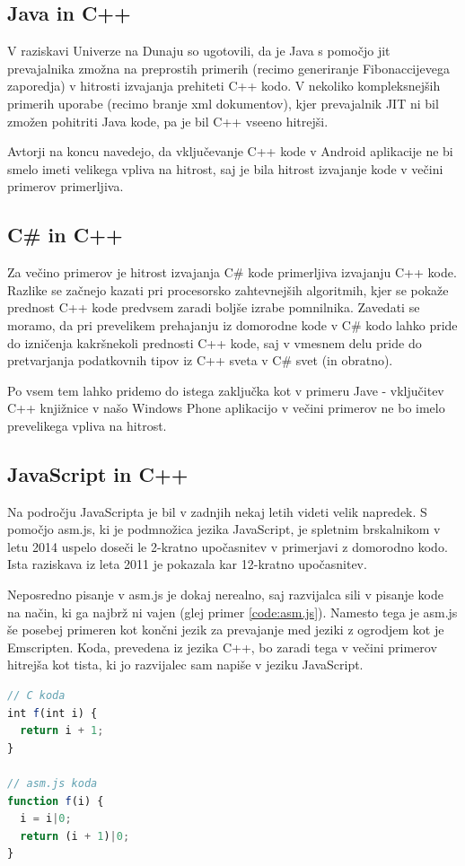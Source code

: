 \subsection{Java in C++}

V raziskavi Univerze na Dunaju\cite{android-cpp} so ugotovili, da je Java s pomočjo \gls{jit} prevajalnika zmožna na preprostih primerih (recimo generiranje Fibonaccijevega zaporedja) v hitrosti izvajanja prehiteti C++ kodo. V nekoliko kompleksnejših primerih uporabe (recimo branje \gls{xml} dokumentov), kjer prevajalnik JIT ni bil zmožen pohitriti Java kode, pa je bil C++ vseeno hitrejši.

Avtorji na koncu navedejo, da vključevanje C++ kode v Android aplikacije ne bi smelo imeti velikega vpliva na hitrost, saj je bila hitrost izvajanje kode v večini primerov primerljiva.

\subsection{C\# in C++}

Za večino primerov je hitrost izvajanja C\# kode primerljiva izvajanju C++ kode. Razlike se začnejo kazati pri procesorsko zahtevnejših algoritmih, kjer se pokaže prednost C++ kode predvsem zaradi boljše izrabe pomnilnika\cite{windows-phone-dev}. Zavedati se moramo, da pri prevelikem prehajanju iz domorodne kode v C\# kodo lahko pride do izničenja kakršnekoli prednosti C++ kode, saj v vmesnem delu pride do pretvarjanja podatkovnih tipov iz C++ sveta v C\# svet (in obratno).

Po vsem tem lahko pridemo do istega zaključka kot v primeru Jave - vključitev C++ knjižnice v našo Windows Phone aplikacijo v večini primerov ne bo imelo prevelikega vpliva na hitrost.

\subsection{JavaScript in C++}

Na področju JavaScripta je bil v zadnjih nekaj letih videti velik napredek. S pomočjo asm.js\cite{asmjs}, ki je podmnožica jezika JavaScript, je spletnim brskalnikom v letu 2014 uspelo doseči le 2-kratno upočasnitev v primerjavi z domorodno kodo. Ista raziskava iz leta 2011 je pokazala kar 12-kratno upočasnitev\cite{html5-gamedev}.

Neposredno pisanje v asm.js je dokaj nerealno, saj razvijalca sili v pisanje kode na način, ki ga najbrž ni vajen (glej primer \ref{code:asm.js}). Namesto tega je asm.js še posebej primeren kot končni jezik za prevajanje med jeziki z ogrodjem kot je Emscripten. Koda, prevedena iz jezika C++, bo zaradi tega v večini primerov hitrejša kot tista, ki jo razvijalec sam napiše v jeziku JavaScript.

\begin{lstlisting}[caption={Primer prevoda C kode v asm.js kodo.}, label=code:asm.js, language=JavaScript]
// C koda
int f(int i) {
  return i + 1;
}

// asm.js koda
function f(i) {
  i = i|0;
  return (i + 1)|0;
}
\end{lstlisting}


